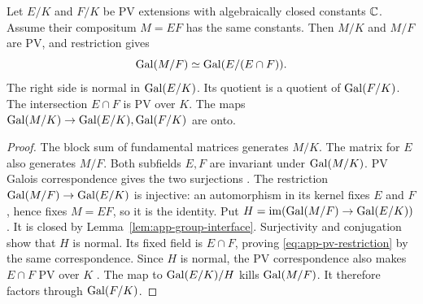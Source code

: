 \begin{lemma}\label{lem:app-pv-compositum}
Let $E/K$ and $F/K$ be PV extensions with algebraically closed constants $\mathbb{C}$.
Assume their compositum $M=EF$ has the same constants.
Then $M/K$ and $M/F$ are PV, and restriction gives
\begin{equation}\label{eq:app-pv-restriction}
 \operatorname{Gal}(M/F)\simeq\operatorname{Gal}(E/(E\cap F)).
\end{equation}
The right side is normal in $\operatorname{Gal}(E/K)$.
Its quotient is a quotient of $\operatorname{Gal}(F/K)$.
The intersection $E\cap F$ is PV over $K$.
The maps $\operatorname{Gal}(M/K)\to\operatorname{Gal}(E/K),\operatorname{Gal}(F/K)$ are onto.
\end{lemma}
\begin{proof}
The block sum of fundamental matrices generates $M/K$.
The matrix for $E$ also generates $M/F$.
Both subfields $E,F$ are invariant under $\operatorname{Gal}(M/K)$.
PV Galois correspondence gives the two surjections
\cite[Proposition~1.34(1)--(2), p.~26]{VanDerPutSinger2002Draft}.
The restriction $\operatorname{Gal}(M/F)\to\operatorname{Gal}(E/K)$ is injective: an automorphism
in its kernel fixes $E$ and $F$, hence fixes $M=EF$, so it is the identity.
Put $H=\operatorname{im}(\operatorname{Gal}(M/F)\to\operatorname{Gal}(E/K))$.
It is closed by Lemma~\ref{lem:app-group-interface}.
Surjectivity and conjugation show that $H$ is normal.
Its fixed field is $E\cap F$, proving
\eqref{eq:app-pv-restriction} by the same correspondence.
Since $H$ is normal, the PV correspondence also makes $E\cap F$ PV over $K$
\cite[Proposition~1.34(2), p.~26]{VanDerPutSinger2002Draft}.
The map to $\operatorname{Gal}(E/K)/H$ kills $\operatorname{Gal}(M/F)$.
It therefore factors through $\operatorname{Gal}(F/K)$.
\end{proof}

